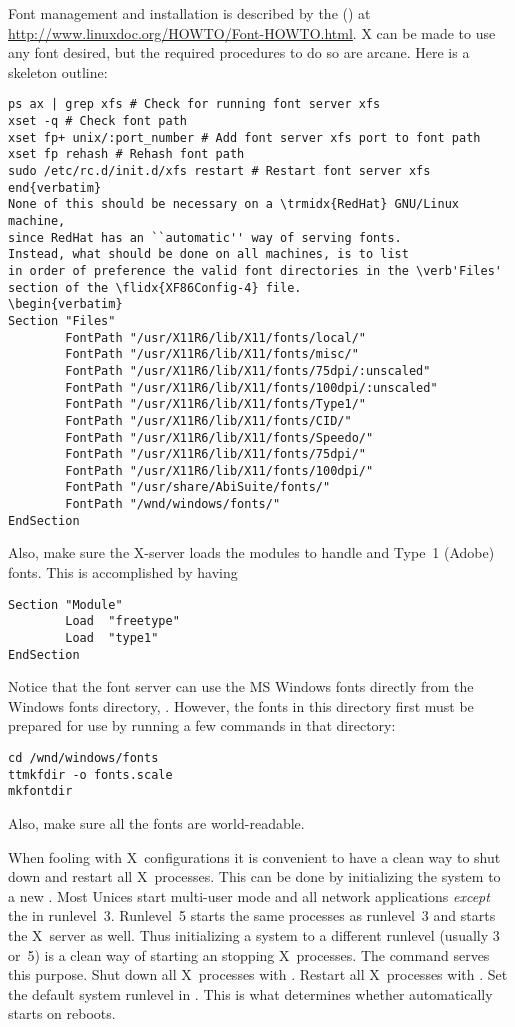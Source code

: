 \documentclass[12pt,twoside]{article}
\begin{document}
Font management and installation is described by the  () at
\url{http://www.linuxdoc.org/HOWTO/Font-HOWTO.html}. 
X can be made to use any font desired, but the required 
procedures to do so are arcane.
Here is a skeleton outline:
\begin{verbatim}
ps ax | grep xfs # Check for running font server xfs
xset -q # Check font path
xset fp+ unix/:port_number # Add font server xfs port to font path
xset fp rehash # Rehash font path
sudo /etc/rc.d/init.d/xfs restart # Restart font server xfs
end{verbatim}
None of this should be necessary on a \trmidx{RedHat} GNU/Linux machine,
since RedHat has an ``automatic'' way of serving fonts.
Instead, what should be done on all machines, is to list
in order of preference the valid font directories in the \verb'Files'
section of the \flidx{XF86Config-4} file.
\begin{verbatim}
Section "Files"
        FontPath "/usr/X11R6/lib/X11/fonts/local/"
        FontPath "/usr/X11R6/lib/X11/fonts/misc/"
        FontPath "/usr/X11R6/lib/X11/fonts/75dpi/:unscaled"
        FontPath "/usr/X11R6/lib/X11/fonts/100dpi/:unscaled"
        FontPath "/usr/X11R6/lib/X11/fonts/Type1/"
        FontPath "/usr/X11R6/lib/X11/fonts/CID/"
        FontPath "/usr/X11R6/lib/X11/fonts/Speedo/"
        FontPath "/usr/X11R6/lib/X11/fonts/75dpi/"
        FontPath "/usr/X11R6/lib/X11/fonts/100dpi/"
        FontPath "/usr/share/AbiSuite/fonts/"
        FontPath "/wnd/windows/fonts/"
EndSection
\end{verbatim}
Also, make sure the X-server loads the modules to handle 
 and Type~1 (Adobe) fonts.
This is accomplished by having 
\begin{verbatim}
Section "Module"
        Load  "freetype"
        Load  "type1"
EndSection
\end{verbatim}
Notice that the font server can use the MS Windows fonts directly from
the Windows fonts directory, .
However, the fonts in this directory first must be prepared for use
by running a few commands in that directory:
\begin{verbatim}
cd /wnd/windows/fonts
ttmkfdir -o fonts.scale
mkfontdir
\end{verbatim}
Also, make sure all the fonts are world-readable.

When fooling with X~configurations it is convenient to have a clean
way to shut down and restart all X~processes.
This can be done by initializing the system to a new
.  
Most Unices start multi-user mode and all network
applications \textit{except} the  in runlevel~3.
Runlevel~5 starts the same processes as runlevel~3 and starts
the X~server as well.
Thus initializing a system to a different runlevel (usually 3 or~5)
is a clean way of starting an stopping X~processes.
The  command serves this purpose.
Shut down all X~processes with .
Restart   all X~processes with .
Set the default system runlevel in .
This is what determines whether  automatically starts on
reboots. 
\end{document}
